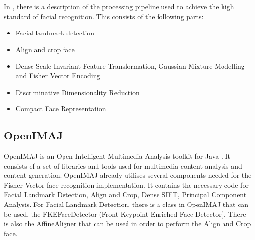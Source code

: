 \documentclass[12pt, a4paper]{article}
\begin{document}
In \cite{simonyan2004fisher}, there is a description of the processing pipeline used to achieve the high standard of facial recognition. This consists of the following parts:
\begin{itemize}
\item Facial landmark detection
\item Align and crop face
\item Dense Scale Invariant Feature Transformation, Gaussian Mixture Modelling and Fisher Vector Encoding
\item Discriminative Dimensionality Reduction
\item Compact Face Representation

\end{itemize}
\subsection*{OpenIMAJ}
OpenIMAJ is an Open Intelligent Multimedia Analysis toolkit for Java \cite{openimaj}. It consists of a set of libraries and tools used for multimedia content analysis and content generation. OpenIMAJ already utilises several components needed for the Fisher Vector face recognition implementation. It contains the necessary code for Facial Landmark Detection, Align and Crop,  Dense SIFT, Principal Component Analysis. 
For Facial Landmark Detection, there is a class in OpenIMAJ that can be used, the FKEFaceDetector (Front Keypoint Enriched Face Detector). There is also the AffineAligner that can be used in order to perform the Align and Crop face. 
\end{document}
